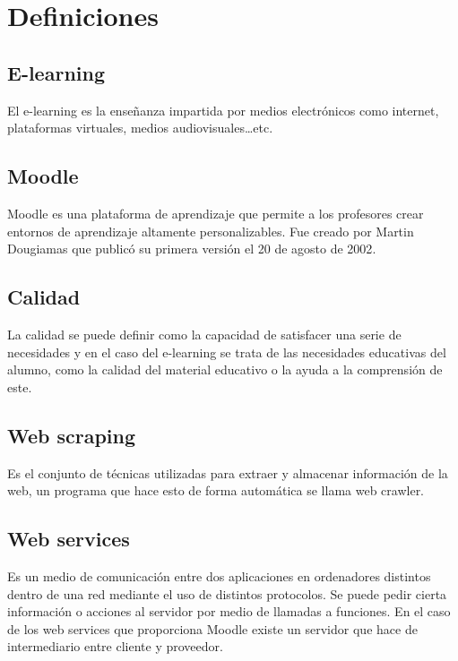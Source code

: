 

\section{Definiciones}

\subsection{E-learning}

El e-learning es la enseñanza impartida por medios electrónicos como internet, plataformas virtuales, medios audiovisuales…etc.

\subsection{Moodle}

Moodle es una plataforma de aprendizaje que permite a los profesores crear entornos de aprendizaje altamente personalizables. Fue creado por Martin Dougiamas que publicó su primera versión el 20 de agosto de 2002\cite{dougiamas2002interpretive}.

\subsection{Calidad}

La calidad se puede definir como la capacidad de satisfacer una serie de necesidades y en el caso del e-learning se trata de las necesidades educativas del alumno, como la calidad del material educativo o la ayuda a la comprensión de este.

\subsection{Web scraping}

Es el conjunto de técnicas utilizadas para extraer y almacenar información de la web, un programa que hace esto de forma automática se llama web crawler.

\subsection{Web services}

Es un medio de comunicación entre dos aplicaciones en ordenadores distintos dentro de una red mediante el uso de distintos protocolos. Se puede pedir cierta información o acciones al servidor por medio de llamadas a funciones. En el caso de los web services que proporciona Moodle existe un servidor que hace de intermediario entre cliente y proveedor\cite{moodle-2020}.


